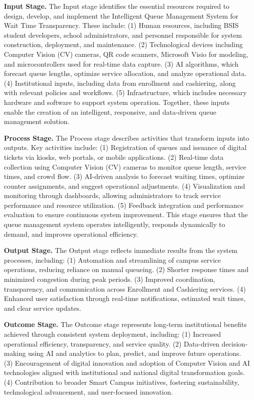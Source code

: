 \documentclass{research}
\begin{document}
\indent\textbf{Input Stage.} The Input stage identifies the essential resources required to design, develop, and implement the Intelligent Queue Management System for Wait Time Transparency. These include: (1) Human resources, including BSIS student developers, school administrators, and personnel responsible for system construction, deployment, and maintenance. (2) Technological devices including Computer Vision (CV) cameras, QR code scanners, Microsoft Visio for modeling, and microcontrollers used for real-time data capture. (3) AI algorithms, which forecast queue lengths, optimize service allocation, and analyze operational data. (4) Institutional inputs, including data from enrollment and cashiering, along with relevant policies and workflows. (5) Infrastructure, which includes necessary hardware and software to support system operation. Together, these inputs enable the creation of an intelligent, responsive, and data-driven queue management solution.

\indent\textbf{Process Stage.} The Process stage describes activities that transform inputs into outputs. Key activities include: (1) Registration of queues and issuance of digital tickets via kiosks, web portals, or mobile applications. (2) Real-time data collection using Computer Vision (CV) cameras to monitor queue length, service times, and crowd flow. (3) AI-driven analysis to forecast waiting times, optimize counter assignments, and suggest operational adjustments. (4) Visualization and monitoring through dashboards, allowing administrators to track service performance and resource utilization. (5) Feedback integration and performance evaluation to ensure continuous system improvement. This stage ensures that the queue management system operates intelligently, responds dynamically to demand, and improves operational efficiency.

\indent\textbf{Output Stage.} The Output stage reflects immediate results from the system processes, including: (1) Automation and streamlining of campus service operations, reducing reliance on manual queueing. (2) Shorter response times and minimized congestion during peak periods. (3) Improved coordination, transparency, and communication across Enrollment and Cashiering services. (4) Enhanced user satisfaction through real-time notifications, estimated wait times, and clear service updates.

\indent\textbf{Outcome Stage.} The Outcome stage represents long-term institutional benefits achieved through consistent system deployment, including: (1) Increased operational efficiency, transparency, and service quality. (2) Data-driven decision-making using AI and analytics to plan, predict, and improve future operations. (3) Encouragement of digital innovation and adoption of Computer Vision and AI technologies aligned with institutional and national digital transformation goals. (4) Contribution to broader Smart Campus initiatives, fostering sustainability, technological advancement, and user-focused innovation.
\end{document}
